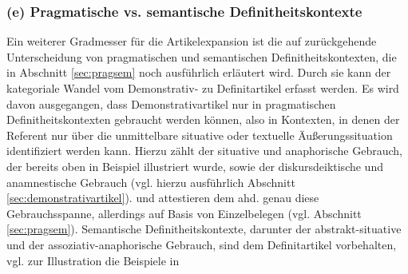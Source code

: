 \subsubsection{(e) Pragmatische vs. semantische Definitheitskontexte} 
Ein weiterer Gradmesser für die Artikelexpansion ist die auf \textcite{Lobner1985,Lobner1998} zurückgehende Unterscheidung von pragmatischen und semantischen Definitheitskontexten, die in Abschnitt \ref{sec:pragsem} noch ausführlich erläutert wird. Durch sie kann der kategoriale Wandel vom Demonstrativ- zu Definitartikel erfasst werden. Es wird davon ausgegangen, dass Demonstrativartikel nur in pragmatischen Definitheitskontexten gebraucht werden können, also in Kontexten, in denen der Referent nur über die unmittelbare situative oder textuelle Äußerungssituation identifiziert werden kann. Hierzu zählt der situative und anaphorische Gebrauch, der bereits oben in Beispiel  illustriert wurde, sowie der diskursdeiktische und anamnestische Gebrauch (vgl. hierzu ausführlich Abschnitt \ref{sec:demonstrativartikel}). \textcite[84-88]{Philippi1997} und \textcite[112-117]{Demske2001} attestieren dem ahd.  genau diese Gebrauchsspanne, allerdings auf Basis von Einzelbelegen (vgl. Abschnitt \ref{sec:pragsem}). Semantische Definitheitskontexte, darunter der abstrakt-situative und der assoziativ-anaphorische Gebrauch, sind dem Definitartikel vorbehalten, vgl. zur Illustration die Beispiele in 

